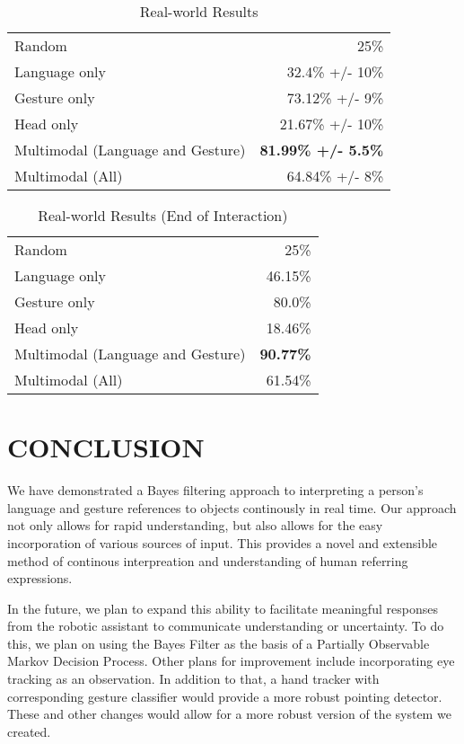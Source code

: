 \documentclass[a4paper, 11pt]{article} %
\begin{document}
\begin{table}
\caption{Real-world Results\label{table:real_results}}
\centering
\begin{tabular}{lr}
\toprule
Random & 25\%\\
Language only &  32.4\% +/- 10\%\\
Gesture only  &  73.12\% +/- 9\%\\
Head only     &  21.67\% +/- 10\%\\
Multimodal (Language and Gesture) & {\bf 81.99\% +/- 5.5\%}\\
Multimodal (All) &  64.84\% +/- 8\%\\
\bottomrule
\end{tabular}
\end{table}
\begin{table}
\caption{Real-world Results (End of Interaction)\label{table:end_real}}
\centering
\begin{tabular}{lr}
\toprule
Random & 25\%\\
Language only &  46.15\%\\
Gesture only  &  80.0\%\\
Head only     & 18.46\%\\
Multimodal (Language and Gesture) & {\bf 90.77\%}\\
Multimodal (All) &  61.54\%\\
\bottomrule
\end{tabular}
\end{table}
\section{CONCLUSION}
We have demonstrated a Bayes filtering approach to interpreting a person's language and gesture references to objects continously in real time. Our approach not only allows for rapid understanding, but also allows for the easy incorporation of various sources of input. This provides a novel and extensible method of continous interpreation and understanding of human referring expressions.

In the future, we plan to expand this ability to facilitate meaningful responses from the robotic assistant to communicate understanding or uncertainty. To do this, we plan on using the Bayes Filter as the basis of a Partially Observable Markov Decision Process. Other plans for improvement include incorporating eye tracking as an observation. In addition to that, a hand tracker with corresponding gesture classifier would provide a more robust pointing detector. These and other changes would allow for a more robust version of the system we created.
\end{document}

